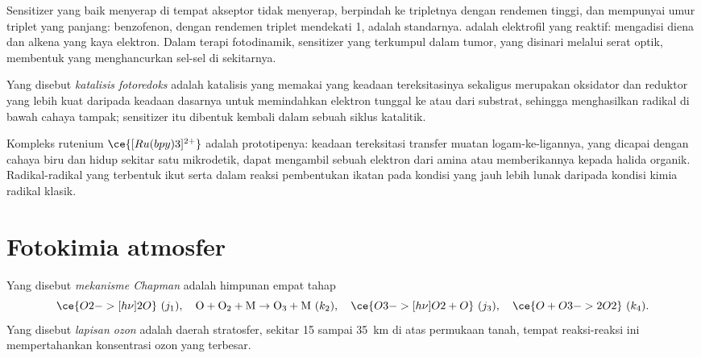 Sensitizer yang baik menyerap di tempat akseptor tidak menyerap, berpindah ke
tripletnya dengan rendemen tinggi, dan mempunyai umur triplet yang panjang:
benzofenon, dengan rendemen triplet mendekati 1, adalah standarnya.  adalah elektrofil yang reaktif:  mengadisi diena dan
alkena yang kaya elektron. Dalam terapi fotodinamik, sensitizer yang
terkumpul dalam tumor, yang disinari melalui serat optik, membentuk  yang menghancurkan sel-sel di sekitarnya.

\begin{definition}\label{def:b3:photochemistry:photoredox}
Yang disebut \emph{katalisis fotoredoks} adalah
katalisis yang memakai  yang keadaan tereksitasinya sekaligus
merupakan oksidator dan reduktor yang lebih kuat daripada keadaan dasarnya
untuk memindahkan elektron tunggal ke atau dari substrat, sehingga
menghasilkan radikal di bawah cahaya tampak; sensitizer itu dibentuk kembali
dalam sebuah siklus katalitik.
\end{definition}

Kompleks rutenium $\ce{[Ru(bpy)3]^{2+}}$ adalah prototipenya: keadaan tereksitasi
transfer muatan logam-ke-ligannya, yang dicapai dengan cahaya biru dan hidup
sekitar satu mikrodetik, dapat mengambil sebuah elektron dari amina atau
memberikannya kepada halida organik. Radikal-radikal yang terbentuk ikut serta
dalam reaksi pembentukan ikatan pada kondisi yang jauh lebih lunak daripada
kondisi kimia radikal klasik.

\section{Fotokimia atmosfer}

\begin{definition}\label{def:b3:photochemistry:chapman}
Yang disebut \emph{mekanisme Chapman} adalah himpunan empat tahap
\[
  \ce{O2 ->[h\nu] 2 O}\ (j_1), \quad \mathrm{O + O_2 + M \to O_3 + M}\ (k_2), \quad
  \ce{O3 ->[h\nu] O2 + O}\ (j_3), \quad \ce{O + O3 -> 2 O2}\ (k_4).
\]
Yang disebut \emph{lapisan ozon} adalah daerah stratosfer,
sekitar 15 sampai \qty{35}{km} di atas permukaan tanah, tempat reaksi-reaksi
ini mempertahankan konsentrasi ozon yang terbesar.
\end{definition}

